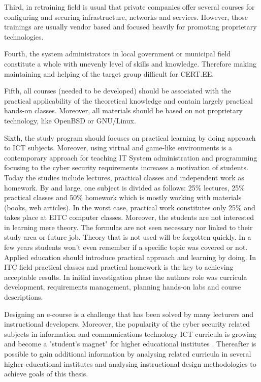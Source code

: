 Third, in retraining field is usual that private companies offer several courses for configuring and securing infrastructure, networks and services. However, those trainings are usually vendor based and focused heavily for promoting proprietary technologies.

Fourth, the system administrators in local government or municipal field constitute a whole with unevenly level of skills and knowledge. Therefore making maintaining and helping of the target group difficult for \gls{CERT.EE}.


Fifth, all courses (needed to be developed) should be associated with the practical applicability of the theoretical knowledge and contain largely practical hands-on classes. Moreover, all materials should be based on not proprietary technology, like \gls{OpenBSD} or \gls{GNU/Linux}.

Sixth, the study program should focuses on practical learning by doing approach to \gls{ICT} subjects. Moreover, using virtual and game-like environments is a contemporary approach for teaching IT System administration and programming focusing to the cyber security requirements increases a motivation of students. Today the studies include lectures, practical classes and independent work as homework. By and large, one subject is divided as follows: 25\% lectures, 25\% practical classes and 50\% homework which is mostly working with materials (books, web articles). In the worst case, practical work constitutes only 25\% and takes place at \gls{EITC} computer classes.
Moreover, the students are not interested in learning mere theory. The formulas are not seen necessary nor linked to their study area or future job. Theory that is not used will be forgotten quickly. In a few years students won't even remember if a specific topic was covered or not. Applied education should introduce practical approach and learning by doing. In ITC field practical classes and practical homework is the key to achieving acceptable results.
In initial investigation phase the authors role was curricula development, requirements management,  planning hands-on labs and course descriptions.


Designing an e-course is a challenge that has been solved by many lecturers and instructional developers. Moreover, the popularity of the cyber security related subjects in information and communications technology ICT curricula is growing and become a "student’s magnet" for higher educational institutes \citep{CyberIsHot}. Thereafter is possible to gain additional information by analysing related curricula in several higher educational institutes and analysing instructional design methodologies to achieve goals of this thesis.

